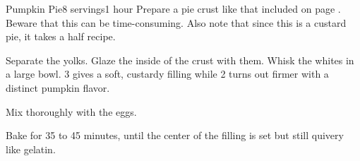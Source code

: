 \documentclass[../Cookbook.tex]{subfiles}
\begin{document}
\begin{recipe}[PumpkinPie]{Pumpkin Pie}{8 servings}{1 hour}
Prepare a pie crust like that included on page \pageref{PieCrust}. Beware that this can be time-consuming. Also note that since this is a custard pie, it takes a half recipe.

Separate the yolks. Glaze the inside of the crust with them.
Whisk the whites in a large bowl. 3 gives a soft, custardy filling while 2 turns out firmer with a distinct pumpkin flavor.

Mix thoroughly with the eggs.

Bake for 35 to 45 minutes, until the center of the filling is set but still quivery like gelatin.


\end{recipe}
\end{document}
